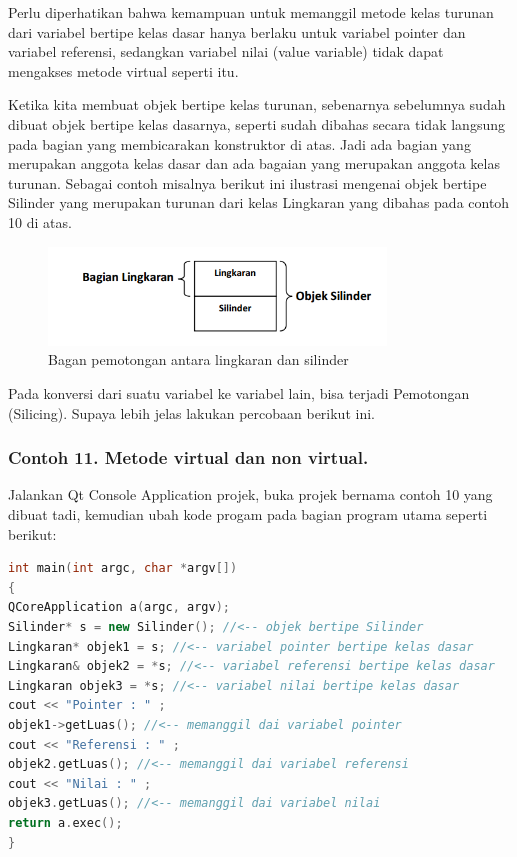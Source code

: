 Perlu diperhatikan bahwa kemampuan untuk memanggil metode kelas turunan
dari variabel bertipe kelas dasar hanya berlaku untuk variabel pointer
dan variabel referensi, sedangkan variabel nilai (value variable) tidak
dapat mengakses metode virtual seperti itu.

Ketika kita membuat objek bertipe kelas turunan, sebenarnya sebelumnya
sudah dibuat objek bertipe kelas dasarnya, seperti sudah dibahas secara
tidak langsung pada bagian yang membicarakan konstruktor di atas. Jadi
ada bagian yang merupakan anggota kelas dasar dan ada bagaian yang
merupakan anggota kelas turunan. Sebagai contoh misalnya berikut ini
ilustrasi mengenai objek bertipe Silinder yang merupakan turunan dari
kelas Lingkaran yang dibahas pada contoh 10 di atas.

\begin{figure}[htbp]
\centering
\includegraphics[width=0.8\textwidth]{images/capture7-6.png}
\caption{Bagan pemotongan antara lingkaran dan silinder}
\end{figure}

Pada konversi dari suatu variabel ke variabel lain, bisa terjadi
Pemotongan (Silicing). Supaya lebih jelas lakukan percobaan berikut ini.

\subsubsection*{Contoh 11. Metode virtual dan non virtual.}

Jalankan Qt Console Application projek, buka projek bernama contoh 10
yang dibuat tadi, kemudian ubah kode progam pada bagian program utama
seperti berikut:



\begin{lstlisting}[language=c++]
int main(int argc, char *argv[])
{
QCoreApplication a(argc, argv);
Silinder* s = new Silinder(); //<-- objek bertipe Silinder
Lingkaran* objek1 = s; //<-- variabel pointer bertipe kelas dasar
Lingkaran& objek2 = *s; //<-- variabel referensi bertipe kelas dasar
Lingkaran objek3 = *s; //<-- variabel nilai bertipe kelas dasar
cout << "Pointer : " ;
objek1->getLuas(); //<-- memanggil dai variabel pointer
cout << "Referensi : " ;
objek2.getLuas(); //<-- memanggil dai variabel referensi
cout << "Nilai : " ;
objek3.getLuas(); //<-- memanggil dai variabel nilai
return a.exec();
}
\end{lstlisting}

